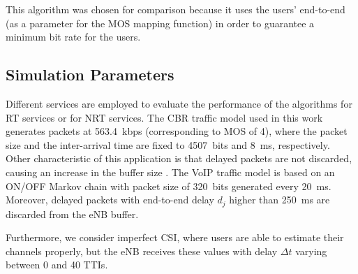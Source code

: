 \documentclass[12pt]{article}
\begin{document}
This algorithm was chosen for comparison because it uses the users' end-to-end (as a parameter for the MOS mapping function) in order to guarantee a minimum bit rate for the users.

\subsection{Simulation Parameters}
\label{Sec:SimulParams}
%
Different services are employed to evaluate the performance of the algorithms for RT services or for NRT services. The \ac{CBR} traffic model used in this work generates packets at 563.4~kbps (corresponding to MOS of 4), where the packet size and the inter-arrival time are fixed to 4507~bits and 8~ms, respectively. Other characteristic of this application is that delayed packets are not discarded, causing an  increase in the buffer size \cite{Nasralla2013}. The \ac{VoIP} traffic model is based on an ON/OFF Markov chain with packet size of 320~bits generated every 20~ms. Moreover, delayed packets with end-to-end delay $d_j$ higher than 250~ms are discarded from the \ac{eNB} buffer. 

Furthermore, we consider imperfect \ac{CSI}, where users are able to estimate their channels properly, but the \ac{eNB} receives these values with delay $\Delta t$ varying between 0 and 40 TTIs.	  
\end{document}
